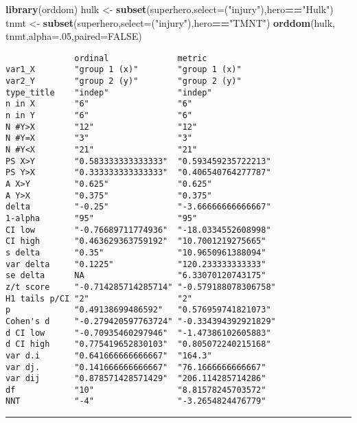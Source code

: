 \documentclass[]{article}
\newenvironment{Shaded}{\begin{snugshade}}{\end{snugshade}}
\newcommand{\DataTypeTok}[1]{\textcolor[rgb]{0.13,0.29,0.53}{#1}}
\newcommand{\DecValTok}[1]{\textcolor[rgb]{0.00,0.00,0.81}{#1}}
\newcommand{\KeywordTok}[1]{\textcolor[rgb]{0.13,0.29,0.53}{\textbf{#1}}}
\newcommand{\NormalTok}[1]{#1}
\newcommand{\OperatorTok}[1]{\textcolor[rgb]{0.81,0.36,0.00}{\textbf{#1}}}
\newcommand{\OtherTok}[1]{\textcolor[rgb]{0.56,0.35,0.01}{#1}}
\newcommand{\StringTok}[1]{\textcolor[rgb]{0.31,0.60,0.02}{#1}}
\begin{document}
\begin{Shaded}
\begin{Highlighting}[]
\KeywordTok{library}\NormalTok{(orddom)}
\NormalTok{hulk <-}\StringTok{ }\KeywordTok{subset}\NormalTok{(superhero,}\DataTypeTok{select=}\NormalTok{(}\StringTok{"injury"}\NormalTok{),hero}\OperatorTok{==}\StringTok{"Hulk"}\NormalTok{)}
\NormalTok{tnmt <-}\StringTok{ }\KeywordTok{subset}\NormalTok{(superhero,}\DataTypeTok{select=}\NormalTok{(}\StringTok{"injury"}\NormalTok{),hero}\OperatorTok{==}\StringTok{"TMNT"}\NormalTok{)}
\KeywordTok{orddom}\NormalTok{(hulk, tnmt,}\DataTypeTok{alpha=}\NormalTok{.}\DecValTok{05}\NormalTok{,}\DataTypeTok{paired=}\OtherTok{FALSE}\NormalTok{)}
\end{Highlighting}
\end{Shaded}

\begin{verbatim}
              ordinal              metric              
var1_X        "group 1 (x)"        "group 1 (x)"       
var2_Y        "group 2 (y)"        "group 2 (y)"       
type_title    "indep"              "indep"             
n in X        "6"                  "6"                 
n in Y        "6"                  "6"                 
N #Y>X        "12"                 "12"                
N #Y=X        "3"                  "3"                 
N #Y<X        "21"                 "21"                
PS X>Y        "0.583333333333333"  "0.593459235722213" 
PS Y>X        "0.333333333333333"  "0.406540764277787" 
A X>Y         "0.625"              "0.625"             
A Y>X         "0.375"              "0.375"             
delta         "-0.25"              "-3.66666666666667" 
1-alpha       "95"                 "95"                
CI low        "-0.76689711774936"  "-18.0334552608998" 
CI high       "0.463629363759192"  "10.7001219275665"  
s delta       "0.35"               "10.9650961388094"  
var delta     "0.1225"             "120.233333333333"  
se delta      NA                   "6.33070120743175"  
z/t score     "-0.714285714285714" "-0.579188078306758"
H1 tails p/CI "2"                  "2"                 
p             "0.49138699486592"   "0.576959741821073" 
Cohen's d     "-0.279420597763724" "-0.334394392921829"
d CI low      "-0.70935460297946"  "-1.47386102605883" 
d CI high     "0.775419652830103"  "0.805072240215168" 
var d.i       "0.641666666666667"  "164.3"             
var dj.       "0.141666666666667"  "76.1666666666667"  
var dij       "0.878571428571429"  "206.114285714286"  
df            "10"                 "8.81578245703572"  
NNT           "-4"                 "-3.2654824476779"  
\end{verbatim}

\begin{center}\rule{0.5\linewidth}{\linethickness}\end{center}
\end{document}
